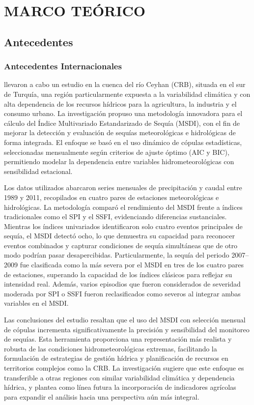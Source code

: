 \chapter{MARCO TEÓRICO}
\section{Antecedentes}
\subsection{Antecedentes Internacionales}
\textcite{Terzi2025} llevaron a cabo un estudio en la cuenca del río Ceyhan (CRB), situada en el sur de Turquía, una región particularmente expuesta a la variabilidad climática y con alta dependencia de los recursos hídricos para la agricultura, la industria y el consumo urbano. La investigación propuso una metodología innovadora para el cálculo del Índice Multivariado Estandarizado de Sequía (MSDI), con el fin de mejorar la detección y evaluación de sequías meteorológicas e hidrológicas de forma integrada. El enfoque se basó en el uso dinámico de cópulas estadísticas, seleccionadas mensualmente según criterios de ajuste óptimo (AIC y BIC), permitiendo modelar la dependencia entre variables hidrometeorológicas con sensibilidad estacional.

Los datos utilizados abarcaron series mensuales de precipitación y caudal entre 1989 y 2011, recopilados en cuatro pares de estaciones meteorológicas e hidrológicas. La metodología comparó el rendimiento del MSDI frente a índices tradicionales como el SPI y el SSFI, evidenciando diferencias sustanciales. Mientras los índices univariados identificaron solo cuatro eventos principales de sequía, el MSDI detectó ocho, lo que demuestra su capacidad para reconocer eventos combinados y capturar condiciones de sequía simultáneas que de otro modo podrían pasar desapercibidas. Particularmente, la sequía del periodo 2007–2009 fue clasificada como la más severa por el MSDI en tres de los cuatro pares de estaciones, superando la capacidad de los índices clásicos para reflejar su intensidad real. Además, varios episodios que fueron considerados de severidad moderada por SPI o SSFI fueron reclasificados como severos al integrar ambas variables en el MSDI.

Las conclusiones del estudio resaltan que el uso del MSDI con selección mensual de cópulas incrementa significativamente la precisión y sensibilidad del monitoreo de sequías. Esta herramienta proporciona una representación más realista y robusta de las condiciones hidrometeorológicas extremas, facilitando la formulación de estrategias de gestión hídrica y planificación de recursos en territorios complejos como la CRB. La investigación sugiere que este enfoque es transferible a otras regiones con similar variabilidad climática y dependencia hídrica, y plantea como línea futura la incorporación de indicadores agrícolas para expandir el análisis hacia una perspectiva aún más integral.

